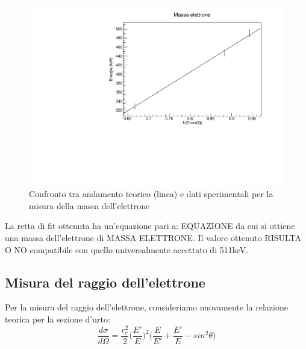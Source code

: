 \documentclass[italian,11pt]{report}
\begin{document}
\begin{figure}[!htp]
\centering
\includegraphics[width=12cm]{massaelettrone.pdf}
\caption{Confronto tra andamento teorico (linea) e dati sperimentali per la misura della massa dell'elettrone}
\end{figure}
La retta di fit ottenuta ha un'equazione pari a: EQUAZIONE
da cui si ottiene una massa dell'elettrone di MASSA ELETTRONE. Il valore ottenuto RISULTA O NO compatibile con quello universalmente accettato di 511keV.

\subsection{Misura del raggio dell'elettrone}
Per la misura del raggio dell'elettrone, consideriamo nuovamente la relazione teorica per la sezione d'urto:
\begin{equation}
\frac{d\sigma}{d\Omega}=\frac{r^2_{e}}{2}\Biggl(\frac{E'}{E}\Biggl)^2\Biggl(\frac{E}{E'}+\frac{E'}{E}-sin^2\theta\Biggl)
\end{equation}
\end{document}
